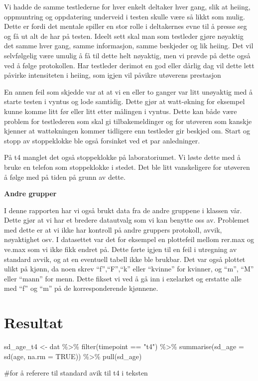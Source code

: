 \documentclass[
  letterpaper,
  DIV=11,
  numbers=noendperiod]{scrreprt}
\newenvironment{Shaded}{\begin{snugshade}}{\end{snugshade}}
\newcommand{\AttributeTok}[1]{\textcolor[rgb]{0.40,0.45,0.13}{#1}}
\newcommand{\CommentTok}[1]{\textcolor[rgb]{0.37,0.37,0.37}{#1}}
\newcommand{\ConstantTok}[1]{\textcolor[rgb]{0.56,0.35,0.01}{#1}}
\newcommand{\FunctionTok}[1]{\textcolor[rgb]{0.28,0.35,0.67}{#1}}
\newcommand{\NormalTok}[1]{\textcolor[rgb]{0.00,0.23,0.31}{#1}}
\newcommand{\OtherTok}[1]{\textcolor[rgb]{0.00,0.23,0.31}{#1}}
\newcommand{\SpecialCharTok}[1]{\textcolor[rgb]{0.37,0.37,0.37}{#1}}
\newcommand{\StringTok}[1]{\textcolor[rgb]{0.13,0.47,0.30}{#1}}
\begin{document}
Vi hadde de samme testlederne for hver enkelt deltaker hver gang, slik
at heiing, oppmuntring og oppdatering underveid i testen skulle være så
likkt som mulig. Dette er fordi det mentale spiller en stor rolle i
deltakernes evne til å presse seg og få ut alt de har på testen. Ideelt
sett skal man som testleder gjøre nøyaktig det samme hver gang, samme
informasjon, samme beskjeder og lik heiing. Det vil selvfølgelig være
umulig å få til dette helt nøyaktig, men vi prøvde på dette også ved å
følge protokollen. Har testleder derimot en god eller dårlig dag vil
dette lett påvirke intensiteten i heiing, som igjen vil påvikre
utøverens prestasjon

En annen feil som skjedde var at at vi en eller to ganger var litt
unøyaktig med å starte testen i vyntus og lode samtidig. Dette gjør at
watt-økning for eksempel kunne komme litt før eller litt etter målingen
i vyntus. Dette kan både være problem for testlederen som skal gi
tilbakemeldinger og for utøveren som kanskje kjenner at wattøkningen
kommer tidligere enn testleder gir beskjed om. Start og stopp av
stoppeklokke ble også forsinket ved et par anledninger.

På t4 manglet det også stoppeklokke på laboratoriumet. Vi løste dette
med å bruke en telefon som stoppeklokke i stedet. Det ble litt
vanskeligere for utøveren å følge med på tiden på grunn av dette.

\textbf{Andre grupper}

I denne rapporten har vi også brukt data fra de andre gruppene i klassen
vår. Dette gjør at vi har et bredere datautvalg som vi kan benytte oss
av. Problemet med dette er at vi ikke har kontroll på andre gruppers
protokoll, avvik, nøyaktighet osv. I datasettet var det for eksempel en
plottefeil mellom rer.max og ve.max som vi ikke fikk endret på. Dette
førte igjen til en feil i utregning av standard avvik, og at en
eventuell tabell ikke ble brukbar. Det var også plottet ulikt på kjønn,
da noen skrev ``f'',``F'',``k'' eller ``kvinne'' for kvinner, og ``m'',
``M'' eller ``mann'' for menn. Dette fikset vi ved å gå inn i exelarket
og erstatte alle med ``f'' og ``m'' på de korresponderende kjønnene.

\section{Resultat}\label{resultat}

\begin{Shaded}
\begin{Highlighting}[]
\NormalTok{sd\_age\_t4 }\OtherTok{\textless{}{-}}\NormalTok{ dat }\SpecialCharTok{\%\textgreater{}\%}
  \FunctionTok{filter}\NormalTok{(timepoint }\SpecialCharTok{==} \StringTok{"t4"}\NormalTok{) }\SpecialCharTok{\%\textgreater{}\%}
  \FunctionTok{summarise}\NormalTok{(}\AttributeTok{sd\_age =} \FunctionTok{sd}\NormalTok{(age, }\AttributeTok{na.rm =} \ConstantTok{TRUE}\NormalTok{)) }\SpecialCharTok{\%\textgreater{}\%}
  \FunctionTok{pull}\NormalTok{(sd\_age)}

\CommentTok{\#for å referere til standard avik til t4 i teksten}
\end{Highlighting}
\end{Shaded}
\end{document}
